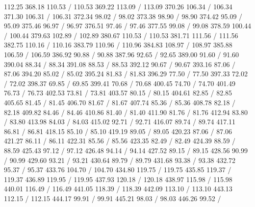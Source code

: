 { 112.25 368.18 110.53 /
 110.53 369.22 113.09 /
 113.09 370.26 106.34 /
 106.34 371.30 106.31 /
 106.31 372.34 98.02 /
 98.02 373.38 98.90 /
 98.90 374.42 95.09 /
 95.09 375.46 96.97 /
 96.97 376.51 97.46 /
 97.46 377.55 99.08 /
 99.08 378.59 100.44 /
 100.44 379.63 102.89 /
 102.89 380.67 110.53 /
 110.53 381.71 111.56 /
 111.56 382.75 110.16 /
 110.16 383.79 110.96 /
 110.96 384.83 108.97 /
 108.97 385.88 106.59 /
 106.59 386.92 90.88 /
 90.88 387.96 92.65 /
 92.65 389.00 91.60 /
 91.60 390.04 88.34 /
 88.34 391.08 88.53 /
 88.53 392.12 90.67 /
 90.67 393.16 87.06 /
 87.06 394.20 85.02 /
 85.02 395.24 81.83 /
 81.83 396.29 77.50 /
 77.50 397.33 72.02 /
 72.02 398.37 69.85 /
 69.85 399.41 70.68 /
 70.68 400.45 74.70 /
 74.70 401.49 76.73 /
 76.73 402.53 73.81 /
 73.81 403.57 80.15 /
 80.15 404.61 82.85 /
 82.85 405.65 81.45 /
 81.45 406.70 81.67 /
 81.67 407.74 85.36 /
 85.36 408.78 82.18 /
 82.18 409.82 84.46 /
 84.46 410.86 81.40 /
 81.40 411.90 81.76 /
 81.76 412.94 83.80 /
 83.80 413.98 84.03 /
 84.03 415.02 92.71 /
 92.71 416.07 89.74 /
 89.74 417.11 86.81 /
 86.81 418.15 85.10 /
 85.10 419.19 89.05 /
 89.05 420.23 87.06 /
 87.06 421.27 86.11 /
 86.11 422.31 85.56 /
 85.56 423.35 82.49 /
 82.49 424.39 88.59 /
 88.59 425.43 97.12 /
 97.12 426.48 94.14 /
 94.14 427.52 89.15 /
 89.15 428.56 90.99 /
 90.99 429.60 93.21 /
 93.21 430.64 89.79 /
 89.79 431.68 93.38 /
 93.38 432.72 95.37 /
 95.37 433.76 104.70 /
 104.70 434.80 119.75 /
 119.75 435.85 119.37 /
 119.37 436.89 119.95 /
 119.95 437.93 120.18 /
 120.18 438.97 115.98 /
 115.98 440.01 116.49 /
 116.49 441.05 118.39 /
 118.39 442.09 113.10 /
 113.10 443.13 112.15 /
 112.15 444.17 99.91 /
 99.91 445.21 98.03 /
 98.03 446.26 99.52 /
}
